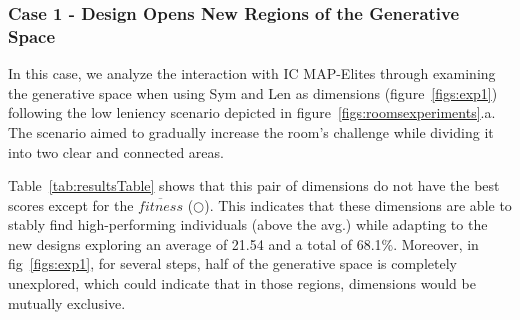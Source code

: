 
\subsubsection{Case 1 - Design Opens New Regions of the Generative Space} \label{sec:case1}

In this case, we analyze the interaction with IC MAP-Elites through examining the generative space when using Sym and Len as dimensions (figure~\ref{figs:exp1}) following the low leniency scenario depicted in figure~\ref{figs:roomsexperiments}.a. The scenario aimed to gradually increase the room's challenge while dividing it into two clear and connected areas.

Table~\ref{tab:resultsTable} shows that this pair of dimensions do not have the best scores except for the $\overline{fitness}$ ($\bigcirc$). This indicates that these dimensions are able to stably find high-performing individuals (above the avg.) while adapting to the new designs exploring an average of 21.54 and a total of 68.1\%. Moreover, in fig~\ref{figs:exp1}, for several steps, half of the generative space is completely unexplored, which could indicate that in those regions, dimensions would be mutually exclusive. 

